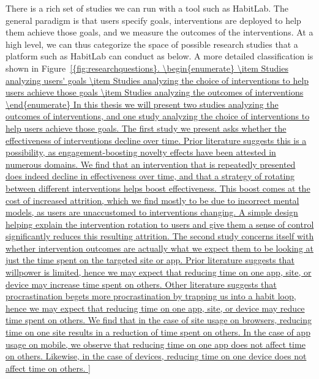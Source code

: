 There is a rich set of studies we can run with a tool such as HabitLab. The general paradigm is that users specify goals, interventions are deployed to help them achieve those goals, and we measure the outcomes of the interventions. At a high level, we can thus categorize the space of possible research studies that a platform such as HabitLab can conduct as below. A more detailed classification is shown in Figure~\ref{{fig:researchquestions}.

\begin{enumerate}
\item Studies analyzing users' goals
\item Studies analyzing the choice of interventions to help users achieve those goals
\item Studies analyzing the outcomes of interventions
\end{enumerate}



In this thesis we will present two studies analyzing the outcomes of interventions, and one study analyzing the choice of interventions to help users achieve those goals.

The first study we present asks whether the effectiveness of interventions decline over time. Prior literature suggests this is a possibility, as engagement-boosting novelty effects have been attested in numerous domains. We find that an intervention that is repeatedly presented does indeed decline in effectiveness over time, and that a strategy of rotating between different interventions helps boost effectiveness. This boost comes at the cost of increased attrition, which we find mostly to be due to incorrect mental models, as users are unaccustomed to interventions changing. A simple design helping explain the intervention rotation to users and give them a sense of control significantly reduces this resulting attrition.

The second study concerns itself with whether intervention outcomes are actually what we expect them to be looking at just the time spent on the targeted site or app. Prior literature suggests that willpower is limited, hence we may expect that reducing time on one app, site, or device may increase time spent on others. Other literature suggests that procrastination begets more procrastination by trapping us into a habit loop, hence we may expect that reducing time on one app, site, or device may reduce time spent on others. We find that in the case of site usage on browsers, reducing time on one site results in a reduction of time spent on others. In the case of app usage on mobile, we observe that reducing time on one app does not affect time on others. Likewise, in the case of devices, reducing time on one device does not affect time on others.

}
